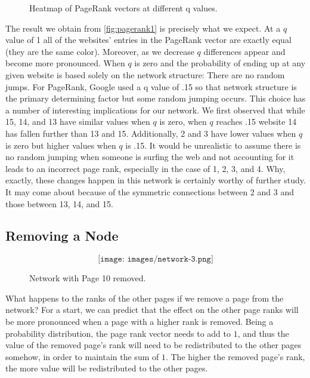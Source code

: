 \documentclass{article}
\begin{document}
\begin{figure}[H]
$$
 
$$
\vspace{-0.4in}
\caption{Heatmap of PageRank vectors at different q values.}
\label{fig:pagerank1}
\end{figure}


The result we obtain from \autoref{fig:pagerank1} is precisely what we expect. At a $q$ value of 1 all of the websites' entries in the PageRank vector are exactly equal (they are the same color). Moreover, as we decrease $q$ differences appear and become more pronounced. When $q$ is zero and the probability of ending up at any given website is based solely on the network structure: There are no random jumps. For PageRank, Google used a q value of .15 so that network structure is the primary determining factor but some random jumping occurs. 
This choice has a number of interesting implications for our network. We first observed that while 15, 14, and 13 have similar values when $q$ is zero, when $q$ reaches .15 website 14 has fallen further than 13 and 15. Additionally, 2 and 3 have lower values when $q$ is zero but higher values when $q$ is .15. It would be unrealistic to assume there is no random jumping when someone is surfing the web and not accounting for it leads to an incorrect page rank, especially in the case of 1, 2, 3, and 4. Why, exactly, these changes happen in this network is certainly worthy of further study. It may come about because of the symmetric connections between 2 and 3 and those between 13, 14, and 15.


\subsection{Removing a Node}
 
\begin{figure}[H]
$$
\texttt{[image: images/network-3.png]} 
$$
\vspace{-0.25in}
\caption{Network with Page 10 removed.}
\label{fig:network3}
\end{figure}

What happens to the ranks of the other pages if we remove a page from the network?
For a start, we can predict that the effect on the other page ranks will be more
pronounced when a page with a higher rank is removed. Being a probability
distribution, the page rank vector needs to add to $1$, and thus the value of the
removed page's rank will need to be redistributed to the other pages somehow, in
order to maintain the sum of $1$. The higher the removed page's rank, the more
value will be redistributed to the other pages.
\end{document}
